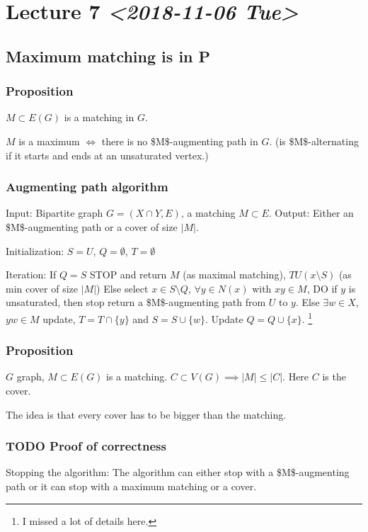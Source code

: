 \documentclass[11pt]{article}
\begin{document}
\section{Lecture 7 \textit{<2018-11-06 Tue>}}
\label{sec:org09233ea}
\subsection{Maximum matching is in P}
\label{sec:org5049d91}
\subsubsection{Proposition}
\label{sec:org2a9e19a}
\(M \subset E(G)\) is a matching in \(G\).

\(M\) is a maximum \(\iff\) there is no \$M\$-augmenting path in \(G\). (is
\$M\$-alternating if it starts and ends at an unsaturated vertex.)
\subsubsection{Augmenting path algorithm}
\label{sec:orgb78a242}
Input: Bipartite graph \(G = (X \cap Y, E)\), a matching \(M \subset E\).
Output: Either an \$M\$-augmenting path or a cover of size \(\vert M \vert\).

Initialization: \(S = U\), \(Q = \emptyset\), \(T = \emptyset\)

Iteration: If \(Q = S\) STOP and return \(M\) (as maximal matching), \(TU(x
    \setminus S)\) (as min cover of size \(\vert M \vert\)) Else select \(x \in S
    \setminus Q\), \(\forall y \in N(x)\) with \(xy\in M\), DO if \(y\) is unsaturated,
then stop return a \$M\$-augmenting path from \(U\) to \(y\). Else \(\exists w \in
    X\), \(yw \in M\) update, \(T = T \cap \{y\}\) and \(S = S \cup \{w\}\). Update \(Q
    = Q \cup \{x\}\). \footnote{I missed a lot of details here.}
\subsubsection{Proposition}
\label{sec:org3b19ede}
\(G\) graph, \(M \subset E(G)\) is a matching. \(C \subset V(G) \implies \vert M
    \vert \le \vert C \vert\). Here \(C\) is the cover.

The idea is that every cover has to be bigger than the matching.
\subsubsection{{\bfseries\sffamily TODO} Proof of correctness}
\label{sec:org6b82d13}
Stopping the algorithm: The algorithm can either stop with a \$M\$-augmenting
path or it can stop with a maximum matching or a cover.
\end{document}
